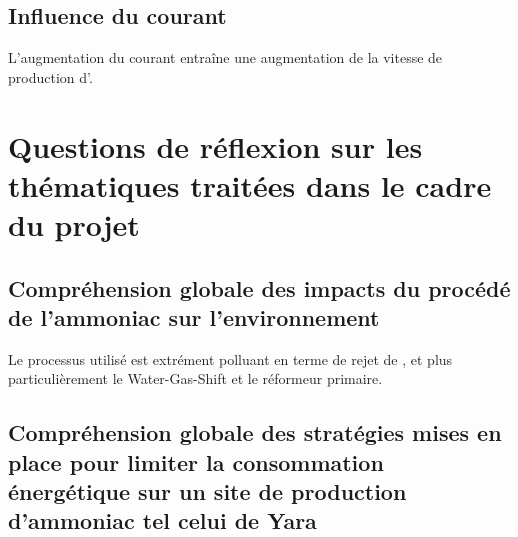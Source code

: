 \subsection{Influence du courant}
L'augmentation du courant entraîne une augmentation
de la vitesse de production d'.

\section{Questions de réflexion sur les thématiques traitées
dans le cadre du projet}
\subsection{Compréhension globale des impacts du procédé de l'ammoniac sur l'environnement}
Le processus utilisé est extrément polluant en terme de rejet de , et
plus particulièrement le Water-Gas-Shift et le réformeur primaire.
\subsection{Compréhension globale des stratégies mises en place pour limiter la consommation 
énergétique sur un site de production d'ammoniac tel celui de Yara}


